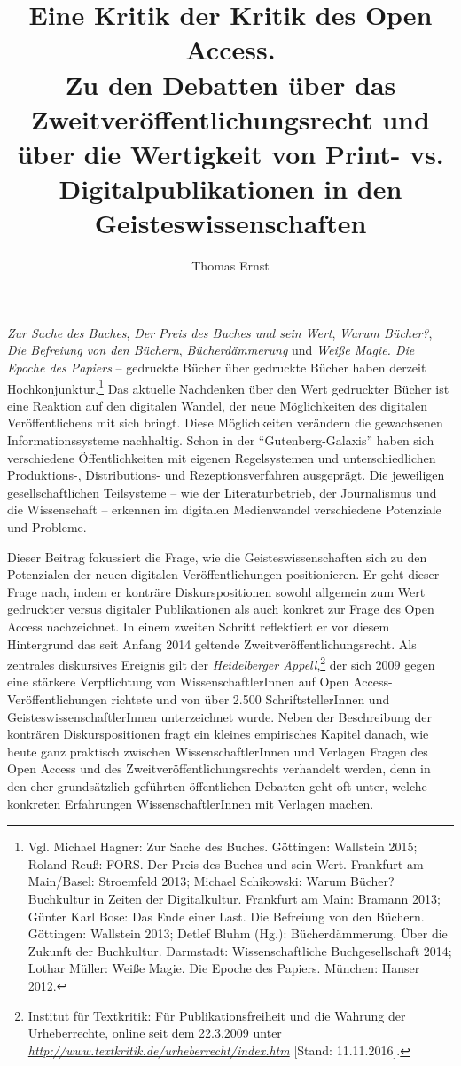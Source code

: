 \documentclass[a4paper,
fontsize=11pt,
oneside,
numbers=noperiodatend,
parskip=half-,
bibliography=totoc,
final
]{scrartcl}
\title{\LARGE{Eine Kritik der Kritik des Open Access. \\ Zu den Debatten über das Zweitveröffentlichungsrecht und über die Wertigkeit von Print- vs. Digitalpublikationen in den Geisteswissenschaften}} %
\author{Thomas Ernst} %
\date{}
\begin{document}
\maketitle
\thispagestyle{fancyplain} 


\emph{Zur Sache des Buches}, \emph{Der Preis des Buches und sein Wert},
\emph{Warum Bücher?}, \emph{Die Befreiung von den Büchern},
\emph{Bücherdämmerung} und \emph{Weiße Magie. Die Epoche des Papiers} --
gedruckte Bücher über gedruckte Bücher haben derzeit
Hochkonjunktur.\footnote{Vgl. Michael Hagner: Zur Sache des Buches.
  Göttingen: Wallstein 2015; Roland Reuß: FORS. Der Preis des Buches und
  sein Wert. Frankfurt am Main/Basel: Stroemfeld 2013; Michael
  Schikowski: Warum Bücher? Buchkultur in Zeiten der Digitalkultur.
  Frankfurt am Main: Bramann 2013; Günter Karl Bose: Das Ende einer
  Last. Die Befreiung von den Büchern. Göttingen: Wallstein 2013; Detlef
  Bluhm (Hg.): Bücherdämmerung. Über die Zukunft der Buchkultur.
  Darmstadt: Wissenschaftliche Buchgesellschaft 2014; Lothar Müller:
  Weiße Magie. Die Epoche des Papiers. München: Hanser 2012.} Das
aktuelle Nachdenken über den Wert gedruckter Bücher ist eine Reaktion
auf den digitalen Wandel, der neue Möglichkeiten des digitalen
Veröffentlichens mit sich bringt. Diese Möglichkeiten verändern die
gewachsenen Informationssysteme nachhaltig. Schon in der
\enquote{Gutenberg-Galaxis} haben sich verschiedene Öffentlichkeiten mit
eigenen Regelsystemen und unterschiedlichen Produktions-, Distributions-
und Rezeptionsverfahren ausgeprägt. Die jeweiligen gesellschaftlichen
Teilsysteme -- wie der Literaturbetrieb, der Journalismus und die
Wissenschaft -- erkennen im digitalen Medienwandel verschiedene
Potenziale und Probleme.

Dieser Beitrag fokussiert die Frage, wie die Geisteswissenschaften sich
zu den Potenzialen der neuen digitalen Veröffentlichungen positionieren.
Er geht dieser Frage nach, indem er konträre Diskurspositionen sowohl
allgemein zum Wert gedruckter versus digitaler Publikationen als auch
konkret zur Frage des Open Access nachzeichnet. In einem zweiten Schritt
reflektiert er vor diesem Hintergrund das seit Anfang 2014 geltende
Zweitveröffentlichungsrecht. Als zentrales diskursives Ereignis gilt der
\emph{Heidelberger Appell},\footnote{Institut für Textkritik: Für
  Publikationsfreiheit und die Wahrung der Urheberrechte, online seit
  dem 22.3.2009 unter
  \href{http://www.textkritik.de/urheberrecht/index.htm}{\emph{http://www.textkritik.de/urheberrecht/index.htm}}
  {[}Stand: 11.11.2016{]}.} der sich 2009 gegen eine stärkere
Verpflichtung von WissenschaftlerInnen auf Open
Access-Veröffentlichungen richtete und von über 2.500
SchriftstellerInnen und GeisteswissenschaftlerInnen unterzeichnet wurde.
Neben der Beschreibung der konträren Diskurspositionen fragt ein kleines
empirisches Kapitel danach, wie heute ganz praktisch zwischen
WissenschaftlerInnen und Verlagen Fragen des Open Access und des
Zweitveröffentlichungsrechts verhandelt werden, denn in den eher
grundsätzlich geführten öffentlichen Debatten geht oft unter, welche
konkreten Erfahrungen WissenschaftlerInnen mit Verlagen machen.
\end{document}
